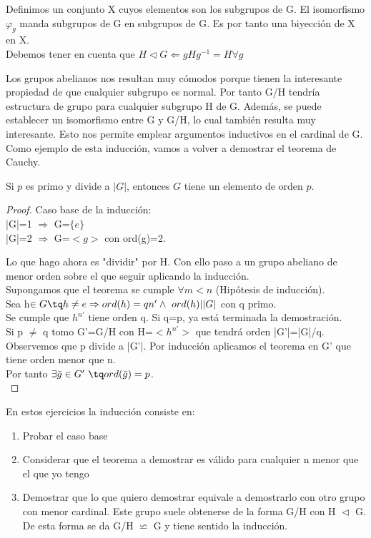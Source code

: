 \documentclass[nochap]{apuntes}
\begin{document}
Definimos un conjunto X cuyos elementos son los subgrupos de G. El isomorfismo $\varphi_{g}$  manda subgrupos de G en subgrupos de G.
Es por tanto una biyección de X en X.\\
Debemos tener en cuenta que $H \vartriangleleft G \Leftarrow gHg^{-1}=H \forall g$

Los grupos abelianos nos resultan muy cómodos porque tienen la interesante propiedad de que cualquier subgrupo es normal. Por tanto
G/H tendría estructura de grupo para cualquier subgrupo H de G. Además, se puede establecer un isomorfismo entre G y G/H, lo cual también
resulta muy interesante. Esto nos permite emplear argumentos inductivos en el cardinal de G.\\
Como ejemplo de esta inducción, vamos a volver a demostrar el teorema de Cauchy.
\begin{theorem}\label{thmCauchy}
 Si $p$ es primo y divide a $|G|$, entonces $G$ tiene un elemento de orden $p$.
\end{theorem}
\begin{proof}
 Caso base de la inducción:\\
 |G|=1 $\Rightarrow$ G=$\{e\}$ \\
 |G|=2 $\Rightarrow$  G=$<g>$  con ord(g)=2.

 Lo que hago ahora es "dividir" por H. Con ello paso a un grupo abeliano de menor orden sobre el que seguir aplicando la inducción.\\
 Supongamos que el teorema se cumple $\forall m < n$  (Hipótesis de inducción).\\
 Sea h$\in G \tq h\neq e\Rightarrow ord(h)=qn' \wedge \ ord(h)| |G|$  con q primo.\\
 Se cumple que $h^{n'}$  tiene orden q. Si q=p, ya está terminada la demostración.\\
 Si p $\neq$ q tomo G'=G/H con H=$<h^{n'}>$  que tendrá orden |G'|=|G|/q.\\
 Observemos que p divide a |G'|. Por inducción aplicamos el teorema en G' que tiene orden menor que n.\\
 Por tanto $\exists \bar{g}\in G' \ \tq ord(\bar{g})=p$.\\
\end{proof}

\begin{defn}[Inducción]
 En estos ejercicios la inducción consiste en:
 \begin{enumerate}
  \item Probar el caso base
  \item Considerar que el teorema a demostrar es válido para cualquier n menor que el que yo tengo
  \item Demostrar que lo que quiero demostrar equivale a demostrarlo con otro grupo con menor cardinal. Este grupo suele obtenerse
  de la forma G/H con H $\vartriangleleft$ G. De esta forma se da G/H $\backsimeq$ G y tiene sentido la inducción.
 \end{enumerate}
\end{defn}
\end{document}
